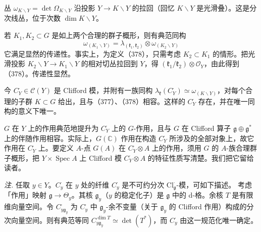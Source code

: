 
丛 $\omega_{K\backslash Y}=\det\Omega_{K\backslash Y}$ 沿投影 $Y\to K\backslash Y$ 的拉回（回忆 $K\backslash Y$ 是光滑叠）。这是分次线丛，位于次数 $\dim K\backslash Y$。

若 $K_1,K_2\subset G$ 是如上两个合理的群子概形，则有典范同构
\begin{equation}\tag{378}
\omega_{(K_1\backslash Y)}=\lambda_{(\mathfrak{k}_1,\mathfrak{k}_2)}\otimes\omega_{(K_2\backslash Y)}
\end{equation}
它满足显然的传递性。事实上，为定义（378），只需考虑 $K_2\subset K_1$ 的情形。把光滑投影 $K_2\backslash Y\to K_1\backslash Y$ 的相对切丛拉回到 $Y$，得 $(\mathfrak{k}_1/\mathfrak{k}_2)\otimes\mathcal{O}_Y$，由此得到（378）。传递性显然。

今 $C_Y^{\cdot}\in\mathcal{C}(Y)$ 是 Clifford 模，并附有一族同构 $\lambda_{\mathfrak{k}}(C_Y^{\cdot})\simeq\omega_{(K\backslash Y)}$，对每个合理的子群 $K\subset G$ 给出，且与（377）、（378）相容。这样的 $C_Y^{\cdot}$ 存在，并在唯一同构的意义下唯一。

$G$ 在 $Y$ 上的作用典范地提升为 $C_Y^{\cdot}$ 上的 $G$-作用，且与 $G$ 在 Clifford 算子 $\mathfrak{g}\oplus\mathfrak{g}^{*}$ 上的伴随作用相容。实际上，$G(\mathbb{C})$ 作用在构造 $C_Y^{\cdot}$ 所涉及的全部对象上，故它作用在 $C_Y^{\cdot}$ 上。要定义 $A$-点 $G(A)$ 在 $C_Y^{\cdot}\otimes A$ 上的作用，须用 $G$ 的 $A$-族合理群子概形，把 $Y\times\operatorname{Spec}A$ 上 Clifford 模 $C_Y^{\cdot}\otimes A$ 的特征性质写清楚。我们把它留给读者。

\emph{注.} 任取 $y\in Y$。$C_y^{\cdot}$ 在 $y$ 处的纤维 $C_y^{\cdot}$ 是不可约分次 $\mathrm{Cl}^{\cdot}_{\mathfrak{g}}$-模，可如下描述。%
考虑「作用」映射 $\mathfrak{g}\to\Theta_y$。其核 $\mathfrak{g}_y$（$y$ 的稳定化子）是 $\mathfrak{g}$ 中的 d-格。余核 $T$ 是有限维向量空间。令 $C_{y\mathfrak{g}_y}^{\cdot}$ 为 $C_y^{\cdot}$ 中 $\mathfrak{g}_y$-余不变量（关于 $\mathfrak{g}_y$ 的 Clifford 作用）构成的分次向量空间。则有典范等同 $C_{y\mathfrak{g}_y}^{\dim T}\simeq\det(T^{*})$，而 $C_y^{\cdot}$ 由这一规范化唯一确定。

